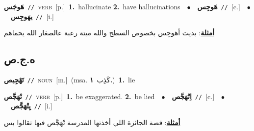 \documentclass[10pt,a4paper,twoside]{article} %
\begin{document}
\begin{multicols}{2}
{\setlength\topsep{0pt}\textbf{\foreignlanguage{arabic}{هَوجَس}}\ {\color{gray}\texttt{//}\color{black}}\ \textsc{verb}\ [p.]\ \textbf{1.}~hallucinate  \textbf{2.}~have hallucinations\ \ $\bullet$\ \ \setlength\topsep{0pt}\textbf{\foreignlanguage{arabic}{هَوجِس}}\ {\color{gray}\texttt{//}\color{black}}\ [c.]\ \ $\bullet$\ \ \setlength\topsep{0pt}\textbf{\foreignlanguage{arabic}{يهَوجِس}}\ {\color{gray}\texttt{//}\color{black}}\ [i.]\  \begin{flushright}\color{gray}\foreignlanguage{arabic}{\textbf{\underline{\foreignlanguage{arabic}{أمثلة}}}: بديت أهوجِس بخصوص السطح والله ميتة رعبة عالصغار الله يحماهم}\end{flushright}\color{black}} \vspace{2mm}

\vspace{-3mm}
\subsection*{\color{blue}\foreignlanguage{arabic}{ه.ج.ص}\color{blue}{}} 

{\setlength\topsep{0pt}\textbf{\foreignlanguage{arabic}{تَهْجِيص}}\ {\color{gray}\texttt{//}\color{black}}\ \textsc{noun}\ [m.]\ \color{gray}(msa. \foreignlanguage{arabic}{كَذِب}~\foreignlanguage{arabic}{\textbf{١.}})\color{black}\ \textbf{1.}~lie\ } \vspace{2mm}

{\setlength\topsep{0pt}\textbf{\foreignlanguage{arabic}{تْهَجَّص}}\ {\color{gray}\texttt{//}\color{black}}\ \textsc{verb}\ [p.]\ \textbf{1.}~be exaggerated.  \textbf{2.}~be lied\ \ $\bullet$\ \ \setlength\topsep{0pt}\textbf{\foreignlanguage{arabic}{اِتْهَجَّص}}\ {\color{gray}\texttt{//}\color{black}}\ [c.]\ \ $\bullet$\ \ \setlength\topsep{0pt}\textbf{\foreignlanguage{arabic}{يِتْهَجَّص}}\ {\color{gray}\texttt{//}\color{black}}\ [i.]\  \begin{flushright}\color{gray}\foreignlanguage{arabic}{\textbf{\underline{\foreignlanguage{arabic}{أمثلة}}}: قصة الجائزة اللي أخذتها المدرسة تْهَجَّص فيها تقالوا بس}\end{flushright}\color{black}} \vspace{2mm}


\end{multicols}
\end{document}
